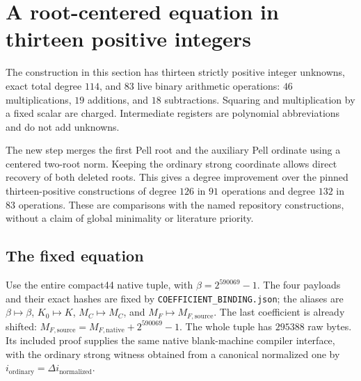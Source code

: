\section{A root-centered equation in thirteen positive integers}
\label{sec:positive13}

The construction in this section has thirteen strictly positive integer
unknowns, exact total degree $114$, and $83$ live binary arithmetic
operations: $46$ multiplications, $19$ additions, and $18$ subtractions.
Squaring and multiplication by a fixed scalar are charged. Intermediate
registers are polynomial abbreviations and do not add unknowns.

The new step merges the first Pell root and the auxiliary Pell ordinate
using a centered two-root norm. Keeping the ordinary strong coordinate
allows direct recovery of both deleted roots. This gives a degree
improvement over the pinned thirteen-positive constructions of degree
$126$ in $91$ operations and degree $132$ in $83$ operations. These are
comparisons with the named repository constructions, without a claim of
global minimality or literature priority.

\subsection{The fixed equation}

Use the entire compact44 native tuple, with
$\beta=2^{590069}-1$. The four payloads and their exact hashes are fixed by
\texttt{COEFFICIENT\_BINDING.json}; the aliases are
$\beta\mapsto\beta$, $K_0\mapsto K$, $M_C\mapsto M_C$, and
$M_F\mapsto M_{F,\mathrm{source}}$.
The last coefficient is already shifted:
$M_{F,\mathrm{source}}=M_{F,\mathrm{native}}+2^{590069}-1$.
The whole tuple has $295388$ raw bytes. Its included proof supplies the
same native blank-machine compiler interface, with the ordinary strong
witness obtained from a canonical normalized one by
$i_{\mathrm{ordinary}}=\Delta i_{\mathrm{normalized}}$.


